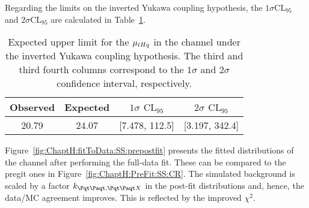 Regarding the limits on the inverted Yukawa coupling hypothesis, the $1\sigma \text{CL}_{95}$ and $2\sigma \text{CL}_{95}$
are calculated in Table~\ref{tab:ASIMOV:SS:ExpectedLimit_ytm1}. 
\begin{table}[h]
\centering
\begin{tabular}{c|c|c|c}
\toprule
Observed & Expected	& $1\sigma$ $\text{CL}_{95}$       	& $2\sigma$ $\text{CL}_{95}$       \\ \midrule
20.79 	& 24.07  		& [7.478, 112.5] 				& [3.197,  342.4] \\ \bottomrule
\end{tabular}
\caption{Expected upper limit for the $\mu_{tHq}$ in the \dilepSStau channel under the
inverted Yukawa coupling hypothesis. 
The third and third fourth columns correspond to the $1\sigma$ and $2\sigma$ confidence interval, respectively. }
\label{tab:ASIMOV:SS:ExpectedLimit_ytm1}
\end{table}

Figure~\ref{fig:ChaptH:fitToData:SS:prepostfit} presents the fitted distributions of the \dilepSStau channel after performing the full-data fit.
These can be compared to the pregit ones in Figure~\ref{fig:ChaptH:PreFit:SS:CR}.
The simulated background is scaled by a factor $k_{\ttbar,\ttX}$ in the post-fit distributions and, hence, the data/MC agreement improves. This is reflected by the improved $\chi^{2}$.

